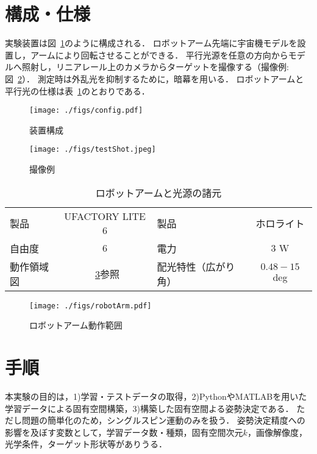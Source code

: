 \documentclass{article}
\begin{document}
\section{構成・仕様}
実験装置は図~\ref{fig:config}のように構成される．
ロボットアーム先端に宇宙機モデルを設置し，アームにより回転させることができる．
平行光源を任意の方向からモデルへ照射し，リニアレール上のカメラからターゲットを撮像する（撮像例:図~\ref{fig:testShot}）．
測定時は外乱光を抑制するために，暗幕を用いる．
ロボットアームと平行光の仕様は表~\ref{tab:armLight}のとおりである．

\begin{figure}[h]
\centering
\texttt{[image: ./figs/config.pdf]}
\caption{装置構成}
\label{fig:config}
\end{figure}

\begin{figure}[tb]
\centering
\texttt{[image: ./figs/testShot.jpeg]}
\caption{撮像例}
\label{fig:testShot}
\end{figure}

\begin{table}[htb]
\begin{center}
\caption{ロボットアームと光源の諸元} \label{tab:armLight}
\begin{tabular}{lc|lc} 
\hline \hline
製品 & UFACTORY LITE 6 & 製品 & ホロライト\\
自由度 & 6  & 電力 & 3 W\\
動作領域図 & ~\ref{fig:arm}参照 &配光特性（広がり角） & $0.48-15$ deg \\ 
\hline \hline
\end{tabular}
\end{center}
\end{table}

\begin{figure}[tb]
\centering
\texttt{[image: ./figs/robotArm.pdf]}
\caption{ロボットアーム動作範囲}
\label{fig:arm}
\end{figure}

\section{手順}
本実験の目的は，1)学習・テストデータの取得，2)PythonやMATLABを用いた学習データによる固有空間構築，3)構築した固有空間よる姿勢決定である．
ただし問題の簡単化のため，シングルスピン運動のみを扱う．
姿勢決定精度への影響を及ぼす変数として，学習データ数・種類，固有空間次元$k$，画像解像度，光学条件，ターゲット形状等がありうる．
\end{document}
